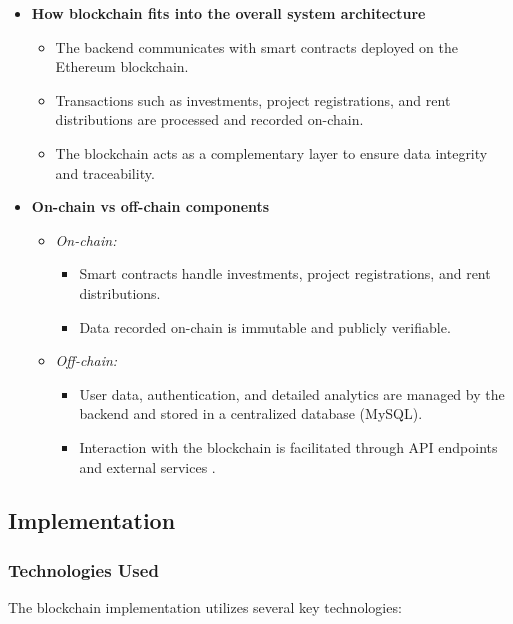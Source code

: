 \begin{itemize}
    \item \textbf{How blockchain fits into the overall system architecture}
    \begin{itemize}
        \item The backend communicates with smart contracts deployed on the Ethereum blockchain.
        \item Transactions such as investments, project registrations, and rent distributions are processed and recorded on-chain.
        \item The blockchain acts as a complementary layer to ensure data integrity and traceability.
    \end{itemize}

    \item \textbf{On-chain vs off-chain components}
    \begin{itemize}
        \item \textit{On-chain:}
        \begin{itemize}
            \item Smart contracts handle investments, project registrations, and rent distributions.
            \item Data recorded on-chain is immutable and publicly verifiable.
        \end{itemize}
        \item \textit{Off-chain:}
        \begin{itemize}
            \item User data, authentication, and detailed analytics are managed by the backend and stored in a centralized database (MySQL).
            \item Interaction with the blockchain is facilitated through API endpoints and external services \cite{Xu2019ArchitectingBlockchainApplications}.
        \end{itemize}
    \end{itemize}

\end{itemize}

\subsection{Implementation}
\subsubsection{Technologies Used}
The blockchain implementation utilizes several key technologies:

